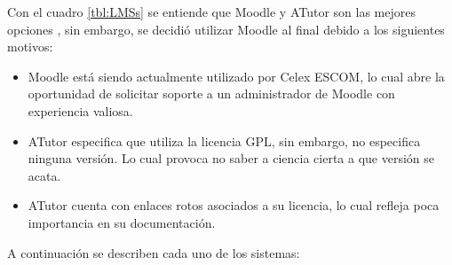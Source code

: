 
\begin{comment}
    \noindent Las fuentes para cada columna de la tabla se obtuvieron de las respectivas páginas de los sistemas gestores de aprendizaje. Dichas páginas se pueden encontrar en:
    \begin{itemize}
        \item Moodle: {https://moodle.com/}
        \item ATutor: {https://atutor.github.io/}
        \item Docebo: {https://www.docebo.com/es/}
        \item Litmos: {https://www.litmos.com/es-LA/}
        \item Gnosis Conect: {https://www.gnosisconnect.com/}
        \item TalentLMS: {https://www.talentlms.com/}
    \end{itemize}
\end{comment}   
    
    \noindent Con el cuadro  \ref{tbl:LMSs} se entiende que Moodle y ATutor son las mejores opciones , sin embargo, se decidió utilizar Moodle al final debido a los siguientes motivos:
    
    \begin{itemize}
        \item Moodle está siendo actualmente utilizado por Celex ESCOM, lo cual abre la oportunidad de solicitar soporte a un administrador de Moodle con experiencia valiosa.
        \item ATutor especifica que utiliza la licencia GPL, sin embargo, no especifica ninguna versión. Lo cual provoca no saber a ciencia cierta a que versión se acata.
        \item ATutor cuenta con enlaces rotos asociados a su licencia, lo cual refleja poca importancia en su documentación.
    \end{itemize}
\clearpage    



A continuación se describen cada uno de los sistemas:



